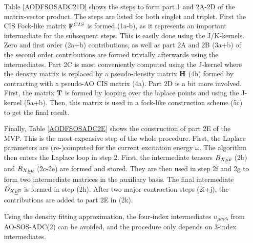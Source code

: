 Table \ref{AODFSOSADC21D} shows the steps to form part 1 and 2A-2D of the matrix-vector product. The steps are listed for both singlet and triplet. First the CIS Fock-like matrix $\mathbf{F}^{CIS}$ is formed (1a-b), as it represents an important intermediate for the subsequent steps. This is easily done using the J/K-kernels. Zero and first order (2a+b) contributions, as well as part 2A and 2B (3a+b) of the second order contributions are formed trivially afterwards using the intermediates. Part 2C is most conveniently computed using the J-kernel where the density matrix is replaced by a pseudo-density matrix $\mathbf{H}$ (4b) formed by contracting with a pseudo-AO CIS matrix (4a). Part 2D is a bit more involved. First, the matrix $\mathbf{T}$ is formed by looping over the laplace points and using the J-kernel (5a+b). Then, this matrix is used in a fock-like construction scheme (5c) to get the final result.

Finally, Table \ref{AODFSOSADC2E} shows the construction of part 2E of the MVP. This is the most expensive step of the whole procedure. First, the Laplace parameters are (re-)computed for the current excitation energy $\omega$. The algorithm then enters the Laplace loop in step 2. First, the intermediate tensors $B_{X\underline{\mu}\overline{\nu}}$ (2b) and $R_{X\underline{\mu}\underline{\nu}}$ (2c-2e) are formed and stored. They are then used in step 2f and 2g to form two intermediate matrices in the auxiliary basis. The final intermediate $D_{X\underline{\mu}\overline{\nu}}$ is formed in step (2h). After two major contraction steps (2i+j), the contributions are added to part 2E in (2k). 

Using the density fitting approximation, the four-index intermediates $u_{\mu\sigma\nu\lambda}$ from AO-SOS-ADC(2) can be avoided, and the procedure only depends on 3-index intermediates. 



